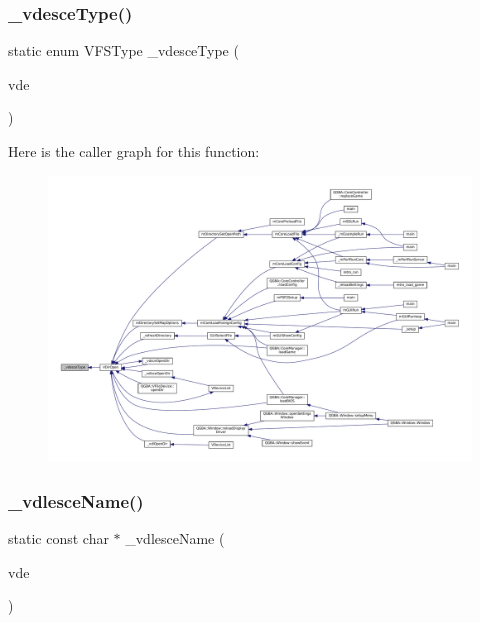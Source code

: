 \subsubsection{\texorpdfstring{\+\_\+vdesce\+Type()}{\_vdesceType()}}
{\footnotesize\ttfamily static enum V\+F\+S\+Type \+\_\+vdesce\+Type (\begin{DoxyParamCaption}\item[{struct V\+Dir\+Entry $\ast$}]{vde }\end{DoxyParamCaption})\hspace{0.3cm}{\ttfamily [static]}}

Here is the caller graph for this function\+:
\nopagebreak
\begin{figure}[H]
\begin{center}
\leavevmode
\includegraphics[width=350pt]{sce-vfs_8c_a81d276ea328a06eb57ab98160bfb6713_icgraph}
\end{center}
\end{figure}
\mbox{\label{sce-vfs_8c_ae3b351bf034b273f767968418e12954d}} 
\subsubsection{\texorpdfstring{\+\_\+vdlesce\+Name()}{\_vdlesceName()}}
{\footnotesize\ttfamily static const char $\ast$ \+\_\+vdlesce\+Name (\begin{DoxyParamCaption}\item[{struct V\+Dir\+Entry $\ast$}]{vde }\end{DoxyParamCaption})\hspace{0.3cm}{\ttfamily [static]}}

